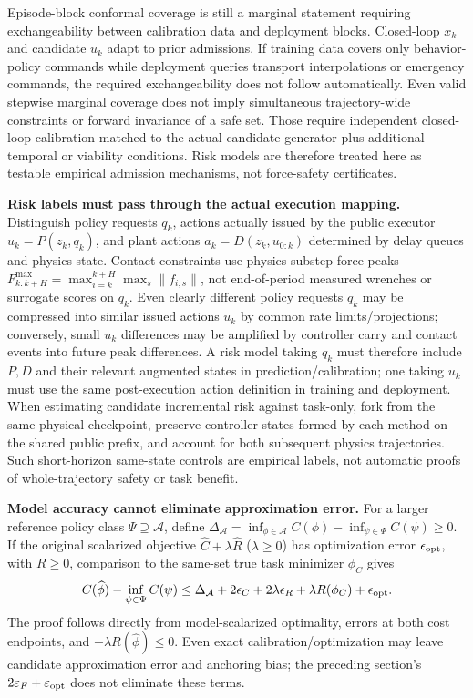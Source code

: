 Episode-block conformal coverage is still a marginal statement requiring exchangeability between calibration data and deployment blocks.
Closed-loop $x_k$ and candidate $u_k$ adapt to prior admissions. If training data covers only behavior-policy commands
while deployment queries transport interpolations or emergency commands, the required exchangeability does not follow automatically.
Even valid stepwise marginal coverage does not imply simultaneous trajectory-wide constraints or forward invariance of a safe set.
Those require independent closed-loop calibration matched to the actual candidate generator plus additional temporal or
viability conditions. Risk models are therefore treated here as testable empirical admission mechanisms, not force-safety
certificates.

\textbf{Risk labels must pass through the actual execution mapping.} Distinguish policy requests $q_k$, actions
actually issued by the public executor $u_k=P(z_k,q_k)$, and plant actions
$a_k=D(z_k,u_{0:k})$ determined by delay queues and physics state. Contact constraints use physics-substep force peaks
$F^{\max}_{k:k+H}=\max_{i=k}^{k+H}\max_s\|f_{i,s}\|$, not end-of-period
measured wrenches or surrogate scores on $q_k$. Even clearly different policy requests $q_k$ may be compressed
into similar issued actions $u_k$ by common rate limits/projections; conversely, small
$u_k$ differences may be amplified by controller carry and contact events into future peak differences.
A risk model taking $q_k$ must therefore include $P,D$ and their relevant augmented states in prediction/calibration;
one taking $u_k$ must use the same post-execution action definition in training and deployment. When estimating candidate
incremental risk against task-only, fork from the same physical checkpoint, preserve controller states formed by each method on the shared
public prefix, and account for both subsequent physics trajectories. Such short-horizon same-state controls are empirical labels,
not automatic proofs of whole-trajectory safety or task benefit.

\textbf{Model accuracy cannot eliminate approximation error.} For a larger reference policy class
$\Psi\supseteq\mathcal A$, define
$\Delta_{\mathcal A}=\inf_{\phi\in\mathcal A}C(\phi)-
\inf_{\psi\in\Psi}C(\psi)\ge0$. If the original scalarized objective
$\widehat C+\lambda\widehat R$ ($\lambda\ge0$) has optimization error $\epsilon_{\rm opt}$,
with $R\ge0$, comparison to the same-set true task minimizer $\phi_C$ gives
\begin{equation}
 C(\widehat\phi)-\inf_{\psi\in\Psi}C(\psi)
 \le\Delta_{\mathcal A}+2\epsilon_C+2\lambda\epsilon_R
   +\lambda R(\phi_C)+\epsilon_{\rm opt}.
\end{equation}
The proof follows directly from model-scalarized optimality, errors at both cost endpoints, and
$-\lambda R(\widehat\phi)\le0$. Even exact calibration/optimization may leave
candidate approximation error and anchoring bias; the preceding section's
$2\varepsilon_F+\varepsilon_{\rm opt}$ does not eliminate these terms.

